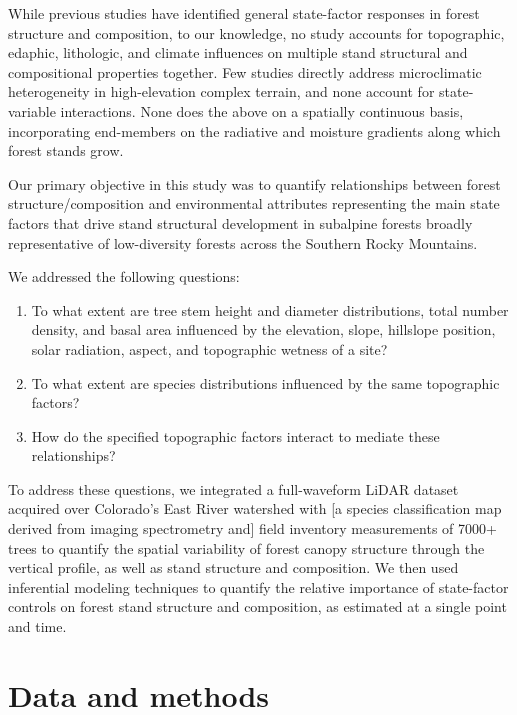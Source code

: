 \documentclass[
  12pt,
]{article}
\providecommand{\tightlist}{%
  \setlength{\itemsep}{0pt}\setlength{\parskip}{0pt}}
\begin{document}
While previous studies have identified general state-factor responses in
forest structure and composition, to our knowledge, no study accounts
for topographic, edaphic, lithologic, and climate influences on multiple
stand structural and compositional properties together. Few studies
directly address microclimatic heterogeneity in high-elevation complex
terrain, and none account for state-variable interactions. None does the
above on a spatially continuous basis, incorporating end-members on the
radiative and moisture gradients along which forest stands grow.

Our primary objective in this study was to quantify relationships
between forest structure/composition and environmental attributes
representing the main state factors that drive stand structural
development in subalpine forests broadly representative of low-diversity
forests across the Southern Rocky Mountains.

We addressed the following questions:

\begin{enumerate}
\def\labelenumi{\arabic{enumi}.}
\tightlist
\item
  To what extent are tree stem height and diameter distributions, total
  number density, and basal area influenced by the elevation, slope,
  hillslope position, solar radiation, aspect, and topographic wetness
  of a site?
\item
  To what extent are species distributions influenced by the same
  topographic factors?
\item
  How do the specified topographic factors interact to mediate these
  relationships?
\end{enumerate}

To address these questions, we integrated a full-waveform LiDAR dataset
acquired over Colorado's East River watershed with {[}a species
classification map derived from imaging spectrometry and{]} field
inventory measurements of 7000+ trees to quantify the spatial
variability of forest canopy structure through the vertical profile, as
well as stand structure and composition. We then used inferential
modeling techniques to quantify the relative importance of state-factor
controls on forest stand structure and composition, as estimated at a
single point and time.

\hypertarget{data-and-methods}{%
\section{Data and methods}\label{data-and-methods}}
\end{document}
